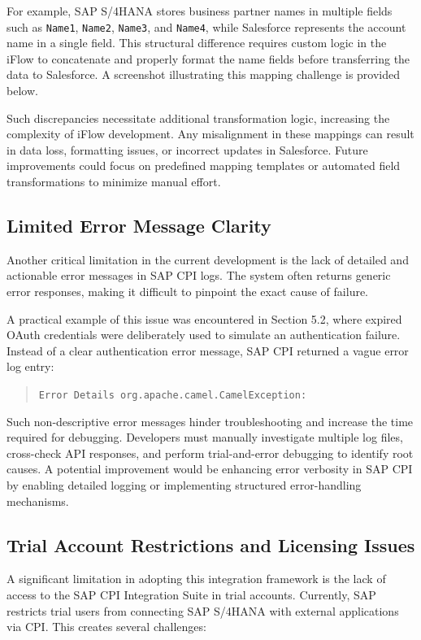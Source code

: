 For example, SAP S/4HANA stores business partner names in multiple fields such as \texttt{Name1}, \texttt{Name2}, \texttt{Name3}, and \texttt{Name4}, while Salesforce represents the account name in a single field. This structural difference requires custom logic in the iFlow to concatenate and properly format the name fields before transferring the data to Salesforce. A screenshot illustrating this mapping challenge is provided below.



Such discrepancies necessitate additional transformation logic, increasing the complexity of iFlow development. Any misalignment in these mappings can result in data loss, formatting issues, or incorrect updates in Salesforce. Future improvements could focus on predefined mapping templates or automated field transformations to minimize manual effort.

\subsection{Limited Error Message Clarity}
Another critical limitation in the current development is the lack of detailed and actionable error messages in SAP CPI logs. The system often returns generic error responses, making it difficult to pinpoint the exact cause of failure.

A practical example of this issue was encountered in Section 5.2, where expired OAuth credentials were deliberately used to simulate an authentication failure. Instead of a clear authentication error message, SAP CPI returned a vague error log entry:

\begin{quote}
\texttt{Error Details org.apache.camel.CamelException:}
\end{quote}

Such non-descriptive error messages hinder troubleshooting and increase the time required for debugging. Developers must manually investigate multiple log files, cross-check API responses, and perform trial-and-error debugging to identify root causes. A potential improvement would be enhancing error verbosity in SAP CPI by enabling detailed logging or implementing structured error-handling mechanisms.

\subsection{Trial Account Restrictions and Licensing Issues}
A significant limitation in adopting this integration framework is the lack of access to the SAP CPI Integration Suite in trial accounts. Currently, SAP restricts trial users from connecting SAP S/4HANA with external applications via CPI. This creates several challenges:

